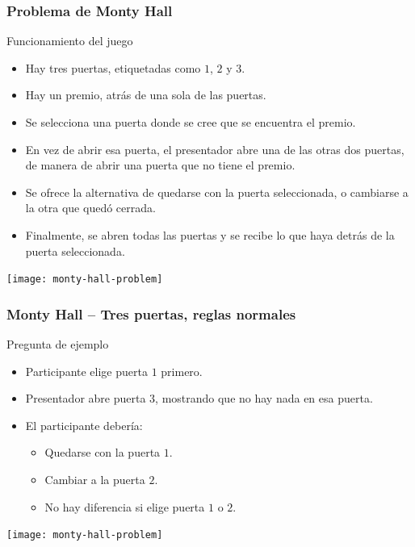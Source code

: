 \documentclass[table]{beamer}
\begin{document}
\begin{frame}
    \frametitle{Problema de Monty Hall}
    \begin{block}{Funcionamiento del juego}
        \begin{itemize}
            \item Hay tres puertas, etiquetadas como $1$, $2$ y $3$.
            \item Hay un premio, atrás de una sola de las puertas.
            \item Se selecciona una puerta donde se cree que se encuentra el premio.
            \item En vez de abrir esa puerta, el presentador abre una de las otras dos puertas, de manera de abrir una puerta que no tiene el premio.
            \item Se ofrece la alternativa de quedarse con la puerta seleccionada, o cambiarse a la otra que quedó cerrada.
            \item Finalmente, se abren todas las puertas y se recibe lo que haya detrás de la puerta seleccionada.
        \end{itemize}
    \end{block}
    \begin{center}
        \texttt{[image: monty-hall-problem]}
    \end{center}
\end{frame}

\begin{frame}
    \frametitle{Monty Hall -- Tres puertas, reglas normales}
    \begin{block}{Pregunta de ejemplo}
        \begin{itemize}
            \item Participante elige puerta $1$ primero.
            \item Presentador abre puerta $3$, mostrando que no hay nada en esa puerta.
            \item El participante debería:
                \begin{itemize}
                    \item Quedarse con la puerta $1$.
                    \item Cambiar a la puerta $2$.
                    \item No hay diferencia si elige puerta $1$ o $2$.
                \end{itemize}
        \end{itemize}
    \end{block}
    \begin{center}
        \texttt{[image: monty-hall-problem]}
    \end{center}
\end{frame}
\end{document}
